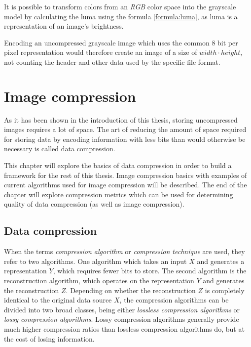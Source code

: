 \documentclass[thesis=M,english]{FITthesis}[2012/10/20]
\begin{document}
It is possible to transform colors from an \emph{RGB} color space into
the grayscale model by calculating the luma using the formula \ref{formula:luma},
as luma is a representation of an image's brightness.

Encoding an uncompressed grayscale image which uses the common 8 bit per pixel
representation would therefore create an image of a size of $width \cdot height$, not counting
the header and other data used by the specific file format.


\chapter{Image compression}
\label{ch:image-compression}
As it has been shown in the introduction of this thesis, storing uncompressed
images requires a lot of space. The art of reducing the amount of space required
for storing data by encoding information with less bits than would otherwise
be necessary is called data compression.

This chapter will explore the basics of data compression in order to build
a framework for the rest of this thesis. Image compression basics with examples
of current algorithms used for image compression will be described. The end of
the chapter will explore compression metrics which can be used for determining
quality of data compression (as well as image compression).


\section{Data compression}
\label{ch:data_compression}
When the terms \emph{compression algorithm} or \emph{compression technique} are
used, they refer to two algorithms. One algorithm which takes an input $X$ and
generates a representation $Y$, which requires fewer bits to store. The second
algorithm is the reconstruction algorithm, which operates on the representation
$Y$ and generates the reconstruction $Z$. Depending on whether the reconstruction
$Z$ is completely identical to the original data source $X$, the compression
algorithms can be divided into two broad classes, being either \emph{lossless
compression algorithms} or \emph{lossy compression algorithms}. Lossy compression
algorithms generally provide much higher compression ratios than lossless compression algorithms
do, but at the cost of losing information.\cite{datacompression}
\end{document}
